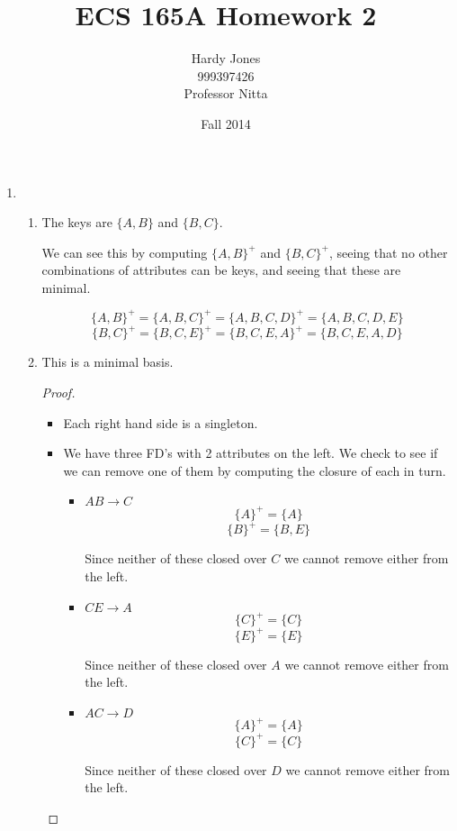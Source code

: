 \documentclass[12pt,letterpaper]{article}
\title{ECS 165A Homework 2\vspace{-2ex}}
\author{Hardy Jones\\
        999397426\\
        Professor Nitta\vspace{-2ex}}
\date{Fall 2014}
\newcommand{\closure}[1]{\{#1\}^+}
\begin{document}
  \maketitle

  \begin{enumerate}
    \item
      \begin{enumerate}
        \item The keys are $\{A,B\}$ and $\{B,C\}$.

          We can see this by computing $\closure{A,B}$ and $\closure{B,C}$,
          seeing that no other combinations of attributes can be keys,
          and seeing that these are minimal.

          \[
            \closure{A,B} = \closure{A,B,C} = \closure{A,B,C,D} = \{A,B,C,D,E\}
          \]
          \[
            \closure{B,C} = \closure{B,C,E} = \closure{B,C,E,A} = \{B,C,E,A,D\}
          \]
        \item This is a minimal basis.

          \begin{proof}
            \begin{itemize}
              \item Each right hand side is a singleton.

              \item
                We have three FD's with 2 attributes on the left.
                We check to see if we can remove one of them by computing the closure of each in turn.

                \begin{itemize}
                  \item $AB \rightarrow C$
                    \[\closure{A} = \{A\}\]
                    \[\closure{B} = \{B,E\}\]

                    Since neither of these closed over $C$ we cannot remove either from the left.
                  \item $CE \rightarrow A$
                    \[\closure{C} = \{C\}\]
                    \[\closure{E} = \{E\}\]

                    Since neither of these closed over $A$ we cannot remove either from the left.
                  \item $AC \rightarrow D$
                    \[\closure{A} = \{A\}\]
                    \[\closure{C} = \{C\}\]

                    Since neither of these closed over $D$ we cannot remove either from the left.
                \end{itemize}


\end{itemize}
\end{proof}
\end{enumerate}
\end{enumerate}
\end{document}
